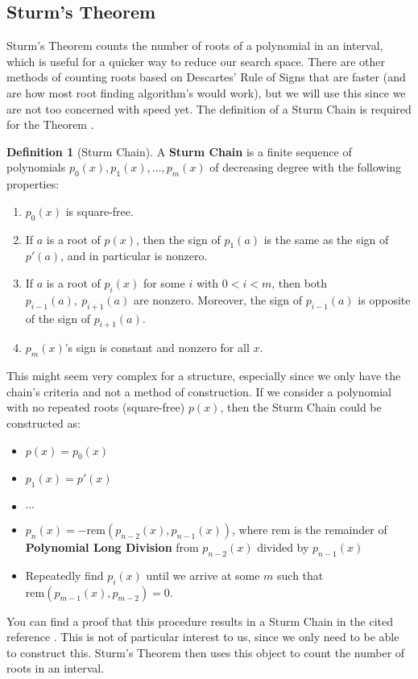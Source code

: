 \documentclass[]{article}
\theoremstyle{definition}
\newtheorem{definition}{Definition}[section]
\begin{document}
\subsection{Sturm's Theorem}
Sturm's Theorem counts the number of roots of a polynomial in an interval, which is useful for a quicker way to reduce our search space. There are other methods of counting roots based on Descartes' Rule of Signs that are faster (and are how most root finding algorithm's would work), but we will use this since we are not too concerned with speed yet. The definition of a Sturm Chain is required for the Theorem \cite{sturm_ref}. 
\begin{definition}[Sturm Chain]
\label{sturm_chain}
A \textbf{Sturm Chain} is a finite sequence of polynomials $p_0(x), p_1(x), \ldots, p_m(x)$ of decreasing degree with the following properties:
\begin{enumerate}
	\item $p_0(x)$ is square-free.
	\item If $a$ is a root of $p(x)$, then the sign of $p_1(a)$ is the same as the sign of $p'(a)$, and in particular is nonzero.
	\item If $a$ is a root of $p_i(x)$ for some $i$ with $0 < i < m$, then both $p_{i-1}(a), \ p_{i+1}(a)$ are nonzero. Moreover, the sign of $p_{i-1}(a)$ is opposite of the sign of $p_{i+1}(a)$.
	\item $p_m(x)$'s sign is constant and nonzero for all $x$.
\end{enumerate}
\end{definition}
This might seem very complex for a structure, especially since we only have the chain's criteria and not a method of construction. If we consider a polynomial with no repeated roots (square-free) $p(x)$, then the Sturm Chain could be constructed as:
\begin{itemize}
	\item $p(x) = p_0(x)$
	\item $p_1(x) = p'(x)$
	\item $\cdots$
	\item $p_{n}(x) = -\textrm{rem}(p_{n-2}(x), p_{n-1}(x))$, where rem is the remainder of \textbf{Polynomial Long Division} from $p_{n-2}(x)$ divided by $p_{n-1}(x)$
	\item Repeatedly find $p_i(x)$ until we arrive at some $m$ such that $\textrm{rem} (p_{m-1} (x), p_{m-2}) = 0$.
\end{itemize}
You can find a proof that this procedure results in a Sturm Chain in the cited reference \cite{sturm_ref}. This is not of particular interest to us, since we only need to be able to construct this. Sturm's Theorem then uses this object to count the number of roots in an interval.
\end{document}
